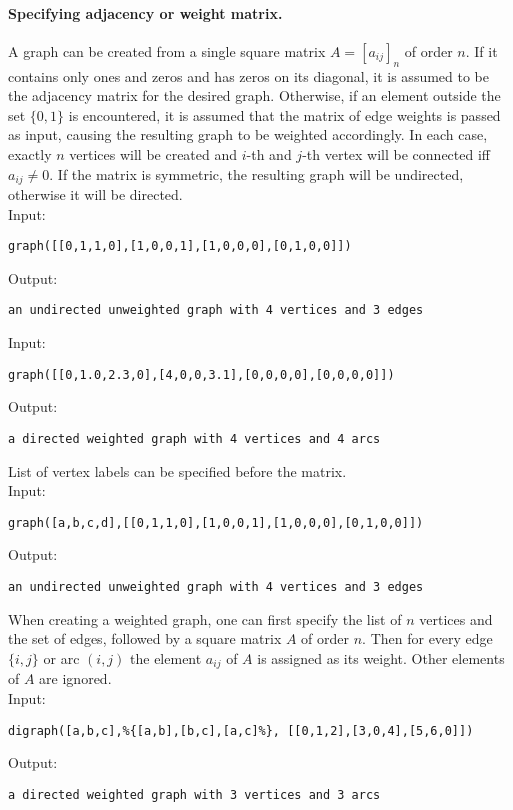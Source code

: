 \documentclass[a4paper,11pt]{article}
\begin{document}
\paragraph{Specifying adjacency or weight matrix.}
A graph can be created from a single square matrix $ A=[a_{ij}]_n $ of order $ n $. If it contains only ones and zeros and has zeros on its diagonal, it is assumed to be the adjacency matrix for the desired graph. Otherwise, if an element outside the set $ \{0,1\} $ is encountered, it is assumed that the matrix of edge weights is passed as input, causing the resulting graph to be weighted accordingly. In each case, exactly $ n $ vertices will be created and $ i $-th and $ j $-th vertex will be connected iff $ a_{ij}\neq 0 $. If the matrix is symmetric, the resulting graph will be undirected, otherwise it will be directed.\\
Input:
\begin{center}
  \tt graph([[0,1,1,0],[1,0,0,1],[1,0,0,0],[0,1,0,0]])
\end{center}
Output:
\begin{center}
  \tt an undirected unweighted graph with 4 vertices and 3 edges
\end{center}
Input:
\begin{center}
  \tt graph([[0,1.0,2.3,0],[4,0,0,3.1],[0,0,0,0],[0,0,0,0]])
\end{center}
Output:
\begin{center}
  \tt a directed weighted graph with 4 vertices and 4 arcs
\end{center}
List of vertex labels can be specified before the matrix.\\
Input:
\begin{center}
  \tt graph([a,b,c,d],[[0,1,1,0],[1,0,0,1],[1,0,0,0],[0,1,0,0]])
\end{center}
Output:
\begin{center}
  \tt an undirected unweighted graph with 4 vertices and 3 edges
\end{center}
When creating a weighted graph, one can first specify the list of $ n $ vertices and the set of edges, followed by a square matrix $ A $ of order $ n $. Then for every edge $ \{i,j\} $ or arc $ (i,j) $ the element $ a_{ij} $ of $ A $ is assigned as its weight. Other elements of $ A $ are ignored.\\
Input:
\begin{center}
  \tt digraph([a,b,c],\%\{[a,b],[b,c],[a,c]\%\}, [[0,1,2],[3,0,4],[5,6,0]])
\end{center}
Output:
\begin{center}
  \tt a directed weighted graph with 3 vertices and 3 arcs
\end{center}
\end{document}

